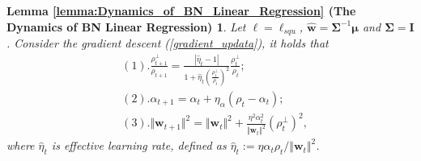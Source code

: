 \documentclass[pdflatex,sn-basic]{sn-jnl}%
\theoremstyle{thmstyleone}%
\begin{document}
\begin{appendices}
\newtheorem*{restate_Dynamics_of_BN_Linear_Regression}{Lemma \ref{lemma:Dynamics_of_BN_Linear_Regression} (The Dynamics of BN Linear Regression)}
\begin{restate_Dynamics_of_BN_Linear_Regression}
  Let $\ell = \ell_{squ}$, $\hat{\mathbf{w}} = \mathbf{\Sigma}^{-1} \boldsymbol{\mu}$ and $\mathbf{\Sigma} = \mathbf{I}$. 
  Consider the gradient descent (\ref{gradient_updata}), 
  it holds that 
  \begin{equation*}
  \begin{aligned}
    & (1).
    \frac{\rho_{t+1}^{\perp}}{\rho_{t+1}} = 
    \frac{|\hat{\eta}_t - 1|}{1 + \hat{\eta}_t \left(\frac{\rho_t^{\perp}}{\rho_t}\right)^2}
    \frac{\rho_t^{\perp}}{\rho_t}; \quad
    \\ & (2). \alpha_{t+1}  = \alpha_t + \eta_{\alpha} \left( \rho_{t} - \alpha_t \right); \quad
    \\ & (3). \Vert \mathbf{w}_{t+1} \Vert^2 = 
      \Vert \mathbf{w}_{t} \Vert^2
      + 
      \frac{\eta^2 \alpha_t^2}{\Vert \mathbf{w}_{t} \Vert^2} \left(\rho_t^{\perp}\right)^2,
  \end{aligned}
  \end{equation*}
  where $\hat{\eta}_t$ is effective learning rate, defined as $\hat{\eta}_{t} := {\eta \alpha_t \rho_{t}}/{\Vert \mathbf{w}_{t} \Vert^{2}}$. 
\end{restate_Dynamics_of_BN_Linear_Regression}


\end{appendices}
\end{document}
